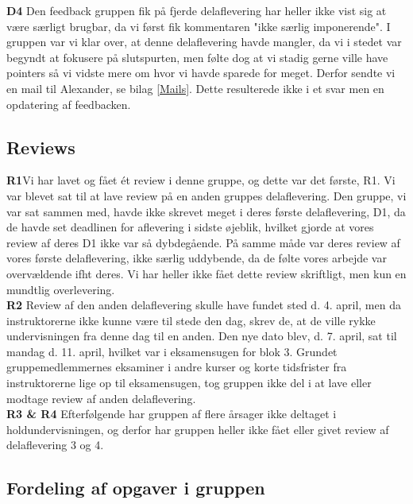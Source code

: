 \documentclass[]{article}
\begin{document}
\textbf{D4} Den feedback gruppen fik på fjerde delaflevering har heller ikke vist sig at være særligt brugbar, da vi først fik kommentaren "ikke særlig imponerende". I gruppen var vi klar over, at denne delaflevering havde mangler, da vi i stedet var begyndt at fokusere på slutspurten, men følte dog at vi stadig gerne ville have pointers så vi vidste mere om hvor vi havde sparede for meget. Derfor sendte vi en mail til Alexander, se bilag \ref{Mails}. Dette resulterede ikke i et svar men en opdatering af feedbacken.

\subsection{Reviews} \label{Reviews}

\textbf{R1}Vi har lavet og fået ét review i denne gruppe, og dette var det første, R1.  Vi var blevet sat til at lave review på en anden gruppes delaflevering. Den gruppe, vi var sat sammen med, havde ikke skrevet meget i deres første delaflevering, D1, da de havde set deadlinen for aflevering  i sidste øjeblik, hvilket gjorde at vores review af deres D1 ikke var så dybdegående. På samme måde var deres review af vores første delaflevering, ikke særlig uddybende, da de følte vores arbejde var overvældende ifht deres. Vi har heller ikke fået dette review skriftligt, men kun en mundtlig overlevering. \\
\textbf{R2} Review af den anden delaflevering skulle have fundet sted d. 4. april, men da instruktorerne ikke kunne være til stede den dag, skrev de, at de ville rykke undervisningen fra denne dag til en anden. Den nye dato blev, d. 7. april, sat til mandag d. 11. april, hvilket var i eksamensugen for blok 3. Grundet gruppemedlemmernes eksaminer i andre kurser og korte tidsfrister fra instruktorerne lige op til eksamensugen, tog gruppen ikke del i at lave eller modtage review af anden delaflevering. \\
\textbf{R3 \& R4} Efterfølgende har gruppen af flere årsager ikke deltaget i holdundervisningen, og derfor har gruppen heller ikke fået eller givet review af delaflevering 3 og 4.

\subsection{Fordeling af opgaver i gruppen}
\end{document}
